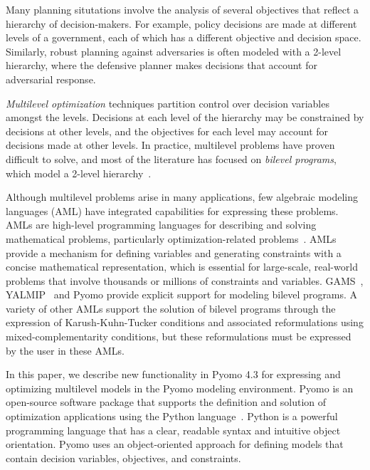 \lstset{language=Python}
\lstset{aboveskip=1em,belowskip=1em,showspaces=false,showstringspaces=false}






Many planning situtations involve the analysis of several objectives
that reflect a hierarchy of decision-makers.  For example, policy
decisions are made at different levels of a government, each of
which has a different objective and decision space.  Similarly, robust planning
against adversaries is often modeled with a 2-level hierarchy, where
the defensive planner makes decisions that account for adversarial
response.

\textit{Multilevel optimization} techniques partition control over
decision variables amongst the levels.  Decisions at each level of
the hierarchy may be constrained by decisions at other levels, and
the objectives for each level may account for decisions made at
other levels.  In practice, multilevel problems have proven difficult
to solve, and most of the literature has focused on \textit{bilevel
programs}, which model a 2-level hierarchy~\citep{ColMarSav07}.

Although multilevel problems arise in many applications, few algebraic
modeling languages (AML) have integrated capabilities for expressing
these problems.  AMLs are high-level programming languages for
describing and solving mathematical problems, particularly
optimization-related problems~\citep{Kal04}.  AMLs provide a mechanism
for defining variables and generating constraints with a concise
mathematical representation, which is essential for large-scale,
real-world problems that involve thousands or millions of constraints
and variables.  GAMS~\citep{GAMS}, YALMIP~\cite{Lof04} and Pyomo
provide explicit support for modeling bilevel programs.  A variety
of other AMLs support the solution of bilevel programs through the
expression of Karush-Kuhn-Tucker conditions and associated
reformulations using mixed-complementarity conditions, but these
reformulations must be expressed by the user in these AMLs.

In this paper, we describe new functionality in Pyomo 4.3 for
expressing and optimizing multilevel models in the Pyomo modeling
environment.  Pyomo is an open-source software package that supports
the definition and solution of optimization applications using the
Python language~\cite{pyomotrac,pyomoweb,HarWatWoo11,HarLaiWatWoo12}.
Python is a powerful programming language that has a clear, readable
syntax and intuitive object orientation.  Pyomo uses an object-oriented
approach for defining models that contain decision variables,
objectives, and constraints.  

